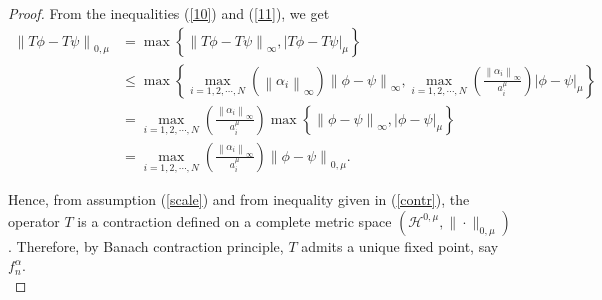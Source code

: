 \documentclass[10pt,a4paper]{amsart}
\begin{document}
\begin{proof}
		From the inequalities (\ref{10}) and (\ref{11}), we get
		\begin{align}\label{contr}
			\left\|T\phi - T\psi\right\|_{0, \mu} & =\max \left\{\left\|T\phi - T\psi\right\|_{\infty},\left|T\phi - T\psi\right|_{\mu}\right\}\nonumber \\
			& \leq \max \left\{\max _{i =1,2,\cdots,N}\left(\left\|\alpha_{i}\right\|_{\infty}\right)\left\|\phi - \psi\right\|_{\infty}, \max _{i =1,2,\cdots,N}\left(\frac{\left\|\alpha_{i}\right\|_{\infty}}{a_{i}^{\mu}}\right)\left|\phi - \psi\right|_{\mu}\right\} \nonumber \\
			& =\max _{i =1,2,\cdots,N}\left(\frac{\left\|\alpha_{i}\right\|_{\infty}}{a_{i}^{\mu}}\right) \max \left\{\left\|\phi - \psi\right\|_{\infty},\left|\phi - \psi\right|_{\mu}\right\} \nonumber\\
			& =\max _{i =1,2,\cdots,N}\left(\frac{\left\|\alpha_{i}\right\|_{\infty}}{a_{i}^{\mu}}\right)\left\|\phi - \psi\right\|_{0, \mu} .
		\end{align}
		
		Hence, from assumption (\ref{scale}) and from inequality given in (\ref{contr}), the operator $T$ is a contraction defined on a complete metric space $\left(\mathcal{H}^{0,\mu}, \|\cdot\|_{0, \mu}\right)$. Therefore, by Banach contraction principle, $T$ admits a unique fixed point, say $f_{n}^{\alpha}$. \\
	\end{proof}
\end{document}
